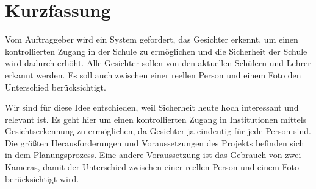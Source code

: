 \chapter*{Kurzfassung}

\begin{flushleft}
	Vom Auftraggeber wird ein System gefordert, das Gesichter erkennt, um einen kontrollierten Zugang in der Schule zu ermöglichen und die Sicherheit der Schule wird dadurch erhöht. Alle Gesichter sollen von den aktuellen Schülern und Lehrer erkannt werden. Es soll auch zwischen einer reellen Person und einem Foto den Unterschied berücksichtigt.
	
	Wir sind für diese Idee entschieden, weil Sicherheit heute hoch interessant und relevant ist. Es geht hier um einen kontrollierten Zugang in Institutionen mittels Gesichtserkennung zu ermöglichen, da Gesichter ja eindeutig für jede Person sind. Die größten Herausforderungen und Voraussetzungen des Projekts befinden sich in dem Planungsprozess. Eine andere Voraussetzung ist das Gebrauch von zwei Kameras, damit der Unterschied zwischen einer reellen Person und einem Foto berücksichtigt wird.
\end{flushleft}

\color{black} 
